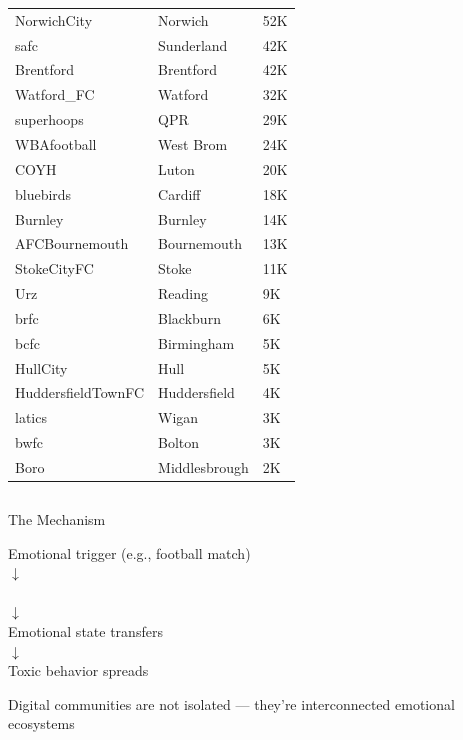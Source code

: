 \documentclass[10pt]{beamer}
\begin{document}
\begin{frame}
\begin{columns}
\begin{column}{0.5\textwidth}
\begin{tabular}{p{.35\linewidth}p{.25\linewidth}p{.1\linewidth}}
NorwichCity & Norwich & 52K \\      
safc & Sunderland & 42K \\
Brentford & Brentford & 42K \\ 
Watford\_FC & Watford & 32K \\
superhoops & QPR & 29K \\
WBAfootball & West Brom & 24K \\ 
COYH & Luton & 20K \\
bluebirds & Cardiff & 18K \\    
Burnley & Burnley & 14K \\
AFCBournemouth & Bournemouth & 13K \\        
StokeCityFC & Stoke & 11K \\  
Urz & Reading & 9K \\
brfc & Blackburn & 6K \\
bcfc & Birmingham & 5K \\          
HullCity & Hull & 5K \\     
HuddersfieldTownFC & Huddersfield & 4K \\
latics & Wigan & 3K \\
bwfc & Bolton & 3K \\
Boro & Middlesbrough & 2K \\
\hline
\end{tabular}
\end{column}
\end{columns}
\label{tab:subreddits}
\end{frame}

\begin{frame}{The Mechanism}
\begin{center}
\large
Emotional trigger (e.g., football match)
\\ $\downarrow$ \\
\\ $\downarrow$ \\
Emotional state transfers 
\\ $\downarrow$ \\
Toxic behavior spreads
\end{center}

Digital communities are not isolated --- they're interconnected emotional ecosystems
\end{frame}
\end{document}

